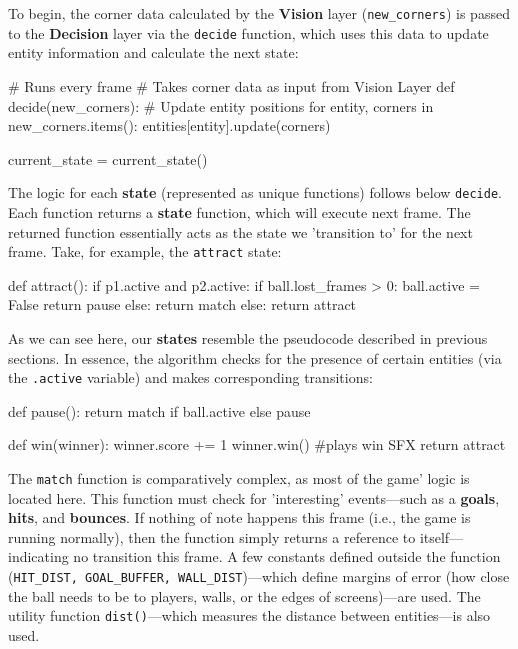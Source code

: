 \documentclass{report}
\newcommand{\state}[1]{\textbf{#1}}
\newcommand{\vision}{\textbf{Vision}\xspace}
\newcommand{\decision}{\textbf{Decision}\xspace}
\begin{document}
To begin, the corner data calculated by the \vision layer (\texttt{new\_corners}) is passed to the \decision layer via the \texttt{decide} function, which uses this data to update entity information and calculate the next state:

\begin{codeblock}
# Runs every frame
# Takes corner data as input from Vision Layer
def decide(new_corners):
    # Update entity positions
    for entity, corners in new_corners.items():
        entities[entity].update(corners)

    current_state = current_state()
\end{codeblock}

The logic for each \state{state} (represented as unique functions) follows below \texttt{decide}. Each function returns a \state{state} function, which will execute next frame. The returned function essentially acts as the state we 'transition to' for the next frame. Take, for example, the \texttt{attract} state:

\begin{codeblock}
def attract():
    if p1.active and p2.active:
        if ball.lost_frames > 0:
            ball.active = False
            return pause
        else:
            return match
    else:
        return attract
\end{codeblock}

As we can see here, our \state{states} resemble the pseudocode described in previous sections. In essence, the algorithm checks for the presence of certain entities (via the \texttt{.active} variable) and makes corresponding transitions:

\begin{codeblock}
def pause():
    return match if ball.active else pause
\end{codeblock}

\begin{codeblock}
def win(winner):
    winner.score += 1
    winner.win() #plays win SFX
    return attract
\end{codeblock}

The \texttt{match} function is comparatively complex, as most of the game' logic is located here. This function must check for 'interesting' events---such as a \state{goals}, \state{hits}, and \state{bounces}. If nothing of note happens this frame (i.e., the game is running normally), then the function simply returns a reference to itself---indicating no transition this frame. A few constants defined outside the function (\texttt{HIT\_DIST, GOAL\_BUFFER, WALL\_DIST})---which define margins of error (how close the ball needs to be to players, walls, or the edges of screens)---are used. The utility function \texttt{dist()}---which measures the distance between entities---is also used. 
\end{document}
